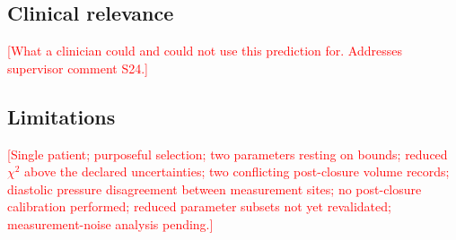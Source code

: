 \subsection{Clinical relevance}
\textcolor{red}{[What a clinician could and could not use this prediction for. Addresses supervisor comment S24.]}

\subsection{Limitations}
\textcolor{red}{[Single patient; purposeful selection; two parameters resting on bounds; reduced $\chi^2$ above the declared uncertainties; two conflicting post-closure volume records; diastolic pressure disagreement between measurement sites; no post-closure calibration performed; reduced parameter subsets not yet revalidated; measurement-noise analysis pending.]}
